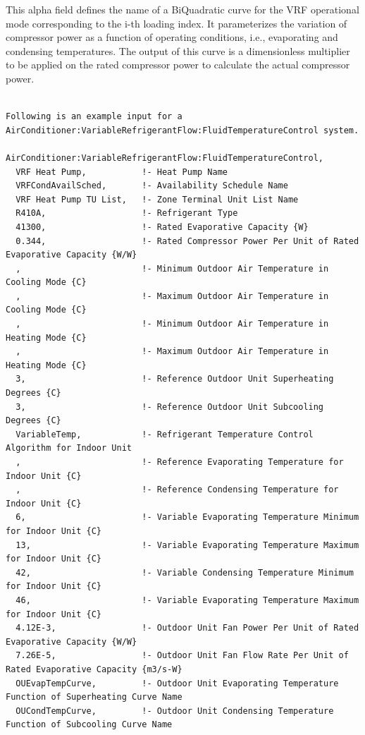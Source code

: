 This alpha field defines the name of a BiQuadratic curve for the VRF operational mode corresponding to the i-th loading index. It parameterizes the variation of compressor power as a function of operating conditions, i.e., evaporating and condensing temperatures. The output of this curve is a dimensionless multiplier to be applied on the rated compressor power to calculate the actual compressor power.

\begin{lstlisting}

Following is an example input for a AirConditioner:VariableRefrigerantFlow:FluidTemperatureControl system.

AirConditioner:VariableRefrigerantFlow:FluidTemperatureControl,
  VRF Heat Pump,           !- Heat Pump Name
  VRFCondAvailSched,       !- Availability Schedule Name
  VRF Heat Pump TU List,   !- Zone Terminal Unit List Name
  R410A,                   !- Refrigerant Type
  41300,                   !- Rated Evaporative Capacity {W}
  0.344,                   !- Rated Compressor Power Per Unit of Rated Evaporative Capacity {W/W}
  ,                        !- Minimum Outdoor Air Temperature in Cooling Mode {C}
  ,                        !- Maximum Outdoor Air Temperature in Cooling Mode {C}
  ,                        !- Minimum Outdoor Air Temperature in Heating Mode {C}
  ,                        !- Maximum Outdoor Air Temperature in Heating Mode {C}
  3,                       !- Reference Outdoor Unit Superheating Degrees {C}
  3,                       !- Reference Outdoor Unit Subcooling Degrees {C}
  VariableTemp,            !- Refrigerant Temperature Control Algorithm for Indoor Unit
  ,                        !- Reference Evaporating Temperature for Indoor Unit {C}
  ,                        !- Reference Condensing Temperature for Indoor Unit {C}
  6,                       !- Variable Evaporating Temperature Minimum for Indoor Unit {C}
  13,                      !- Variable Evaporating Temperature Maximum for Indoor Unit {C}
  42,                      !- Variable Condensing Temperature Minimum for Indoor Unit {C}
  46,                      !- Variable Evaporating Temperature Maximum for Indoor Unit {C}
  4.12E-3,                 !- Outdoor Unit Fan Power Per Unit of Rated Evaporative Capacity {W/W}
  7.26E-5,                 !- Outdoor Unit Fan Flow Rate Per Unit of Rated Evaporative Capacity {m3/s-W}
  OUEvapTempCurve,         !- Outdoor Unit Evaporating Temperature Function of Superheating Curve Name
  OUCondTempCurve,         !- Outdoor Unit Condensing Temperature Function of Subcooling Curve Name

\end{lstlisting}

